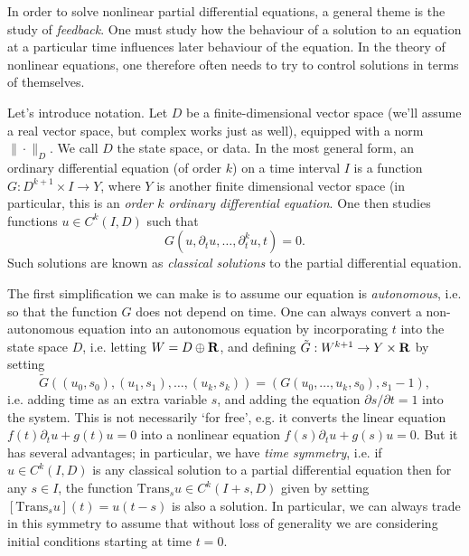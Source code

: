 In order to solve nonlinear partial differential equations, a general theme is the study of \emph{feedback}. One must study how the behaviour of a solution to an equation at a particular time influences later behaviour of the equation. In the theory of nonlinear equations, one therefore often needs to try to control solutions in terms of themselves.

Let's introduce notation. Let $D$ be a finite-dimensional vector space (we'll assume a real vector space, but complex works just as well), equipped with a norm $\| \cdot \|_D$. We call $D$ the state space, or data. In the most general form, an ordinary differential equation (of order $k$) on a time interval $I$ is a function $G: D^{k+1} \times I \to Y$, where $Y$ is another finite dimensional vector space (in particular, this is an \emph{order $k$ ordinary differential equation}. One then studies functions $u \in C^k(I,D)$ such that
%
\[ G(u,\partial_t u, \dots, \partial_t^k u,t) = 0. \]
%
Such solutions are known as \emph{classical solutions} to the partial differential equation.

The first simplification we can make is to assume our equation is \emph{autonomous}, i.e. so that the function $G$ does not depend on time. One can always convert a non-autonomous equation into an autonomous equation by incorporating $t$ into the state space $D$, i.e. letting $W = D \oplus \operatorname{\mathbf{R}}$, and defining $\tilde{G}: W^{k+1} \to Y \times \operatorname{\mathbf{R}}$ by setting
%
\[ \tilde{G}((u_0,s_0), (u_1,s_1), \dots, (u_k,s_k)) = ( G(u_0,\dots,u_k,s_0), s_1 - 1 ), \]
%
i.e. adding time as an extra variable $s$, and adding the equation $\partial s / \partial t = 1$ into the system. This is not necessarily `for free', e.g. it converts the linear equation $f(t) \partial_t u + g(t) u = 0$ into a nonlinear equation $f(s) \partial_t u + g(s) u = 0$. But it has several advantages; in particular, we have \emph{time symmetry}, i.e. if $u \in C^k(I,D)$ is any classical solution to a partial differential equation then for any $s \in I$, the function $\text{Trans}_s u \in C^k(I + s,D)$ given by setting $[\text{Trans}_s u](t) = u(t - s)$ is also a solution. In particular, we can always trade in this symmetry to assume that without loss of generality we are considering initial conditions starting at time $t = 0$.


